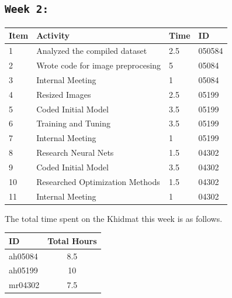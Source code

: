 \documentclass{article}
\begin{document}
\subsection{\texttt{Week 2: }}
\begin{center}
\begin{tabular}{|l|l|l|l|}
  \hline
  \textbf{Item} 	& \textbf{Activity} & \textbf{Time} & \textbf{ID} \\\hline
  1 & Analyzed the compiled dataset & 2.5 & 050584 \\ \hline
  2 & Wrote code for image preprocesing & 5 & 05084 \\ \hline
  3 & Internal Meeting & 1 & 05084 \\ \hline
  4 & Resized Images & 2.5 & 05199  \\ \hline
  5 & Coded Initial Model & 3.5 & 05199 \\ \hline 
  6 & Training and Tuning & 3.5 & 05199 \\ \hline
  7 & Internal Meeting & 1 & 05199 \\ \hline
  8 & Research Neural Nets & 1.5 & 04302 \\ \hline
  9 & Coded Initial Model & 3.5 & 04302 \\ \hline
  10 & Researched Optimization Methods & 1.5 & 04302 \\ \hline
  11 & Internal Meeting & 1 & 04302 \\ \hline
\end{tabular}
    
\end{center}
The total time spent on the Khidmat this week is as follows.    

\begin{center}
\begin{tabular}{|l|c|}
  \hline
  \textbf{ID} & \textbf{Total Hours}\\\hline
  ah05084 & 8.5 \\\hline
  ah05199 & 10 \\\hline
  mr04302 & 7.5 \\\hline
\end{tabular}
\end{center}
\end{document}
